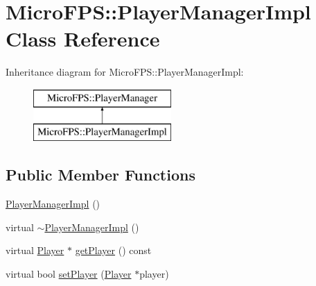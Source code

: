 \hypertarget{class_micro_f_p_s_1_1_player_manager_impl}{
\section{MicroFPS::PlayerManagerImpl Class Reference}
\label{da/db1/class_micro_f_p_s_1_1_player_manager_impl}
}
Inheritance diagram for MicroFPS::PlayerManagerImpl:\begin{figure}[H]
\begin{center}
\leavevmode
\includegraphics[height=2.000000cm]{da/db1/class_micro_f_p_s_1_1_player_manager_impl}
\end{center}
\end{figure}
\subsection*{Public Member Functions}
\begin{DoxyCompactItemize}
\item 
\hyperlink{class_micro_f_p_s_1_1_player_manager_impl_a76938231c208b8b16f76c95b23493446}{PlayerManagerImpl} ()
\item 
virtual \hyperlink{class_micro_f_p_s_1_1_player_manager_impl_a9a19669ec555580e721cef6a08f720e1}{$\sim$PlayerManagerImpl} ()
\item 
virtual \hyperlink{class_micro_f_p_s_1_1_player}{Player} $\ast$ \hyperlink{class_micro_f_p_s_1_1_player_manager_impl_a95b84e7b440182d0527d2306aa6ac3a3}{getPlayer} () const 
\item 
virtual bool \hyperlink{class_micro_f_p_s_1_1_player_manager_impl_a4f69ae6977b4d92b8cdb4da09812a942}{setPlayer} (\hyperlink{class_micro_f_p_s_1_1_player}{Player} $\ast$player)
\end{DoxyCompactItemize}


